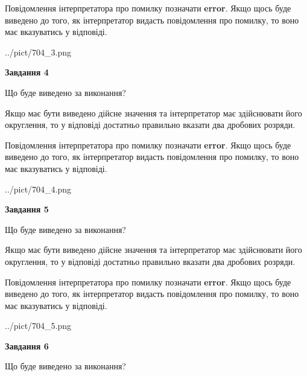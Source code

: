 \documentclass[12pt, ukrainian]{article}
\begin{document}
{\begin {Large}
Повідомлення інтерпретатора про помилку позначати \textbf{error}.
Якщо щось буде виведено до того, як інтерпретатор видасть повідомлення про помилку, 
то воно має вказуватись у відповіді. \par

\begin{center}
	{../pict/704_3.png}
\end{center}
\newpage

{\begin {center}\textbf{Завдання 4}\end {center}}\par
Що буде виведено за виконання? \par

Якщо має бути виведено дійсне значення та інтерпретатор має здійснювати його округлення, 
то у відповіді достатньо правильно вказати два дробових розряди.

Повідомлення інтерпретатора про помилку позначати \textbf{error}.
Якщо щось буде виведено до того, як інтерпретатор видасть повідомлення про помилку, 
то воно має вказуватись у відповіді. \par

\begin{center}
	{../pict/704_4.png}
\end{center}
\newpage

{\begin {center}\textbf{Завдання 5}\end {center}}\par
Що буде виведено за виконання? \par

Якщо має бути виведено дійсне значення та інтерпретатор має здійснювати його округлення, 
то у відповіді достатньо правильно вказати два дробових розряди.

Повідомлення інтерпретатора про помилку позначати \textbf{error}.
Якщо щось буде виведено до того, як інтерпретатор видасть повідомлення про помилку, 
то воно має вказуватись у відповіді. \par

\begin{center}
	{../pict/704_5.png}
\end{center}
\newpage

{\begin {center}\textbf{Завдання 6}\end {center}}\par
Що буде виведено за виконання? \par


\end{Large}}
\end{document}
